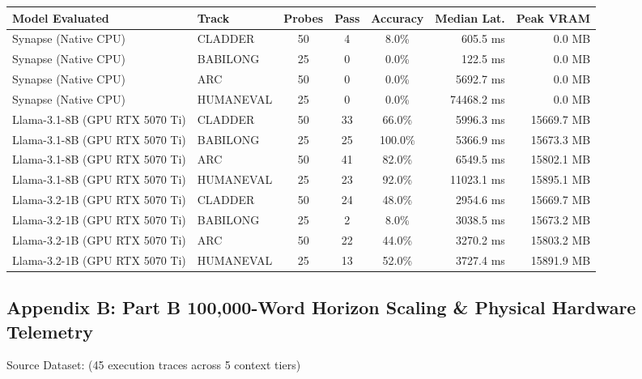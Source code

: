 {\footnotesize\sffamily
\setlength{\tabcolsep}{4pt}
\noindent\begin{tabularx}{\textwidth}{p{3.4cm} X c c c r r}
\toprule
\textbf{\color{brandnavy}Model Evaluated} & \textbf{\color{brandnavy}Track} & \textbf{\color{brandnavy}Probes} & \textbf{\color{brandnavy}Pass} & \textbf{\color{brandnavy}Accuracy} & \textbf{\color{brandnavy}Median Lat.} & \textbf{\color{brandnavy}Peak VRAM} \\
\midrule
Synapse (Native CPU) & CLADDER & 50 & 4 & 8.0\% & 605.5 ms & 0.0 MB \\
Synapse (Native CPU) & BABILONG & 25 & 0 & 0.0\% & 122.5 ms & 0.0 MB \\
Synapse (Native CPU) & ARC & 50 & 0 & 0.0\% & 5692.7 ms & 0.0 MB \\
Synapse (Native CPU) & HUMANEVAL & 25 & 0 & 0.0\% & 74468.2 ms & 0.0 MB \\
Llama-3.1-8B (GPU RTX 5070 Ti) & CLADDER & 50 & 33 & 66.0\% & 5996.3 ms & 15669.7 MB \\
Llama-3.1-8B (GPU RTX 5070 Ti) & BABILONG & 25 & 25 & 100.0\% & 5366.9 ms & 15673.3 MB \\
Llama-3.1-8B (GPU RTX 5070 Ti) & ARC & 50 & 41 & 82.0\% & 6549.5 ms & 15802.1 MB \\
Llama-3.1-8B (GPU RTX 5070 Ti) & HUMANEVAL & 25 & 23 & 92.0\% & 11023.1 ms & 15895.1 MB \\
Llama-3.2-1B (GPU RTX 5070 Ti) & CLADDER & 50 & 24 & 48.0\% & 2954.6 ms & 15669.7 MB \\
Llama-3.2-1B (GPU RTX 5070 Ti) & BABILONG & 25 & 2 & 8.0\% & 3038.5 ms & 15673.2 MB \\
Llama-3.2-1B (GPU RTX 5070 Ti) & ARC & 50 & 22 & 44.0\% & 3270.2 ms & 15803.2 MB \\
Llama-3.2-1B (GPU RTX 5070 Ti) & HUMANEVAL & 25 & 13 & 52.0\% & 3727.4 ms & 15891.9 MB \\
\bottomrule
\end{tabularx}
\vspace{0.2em}
}

\vspace{0.8em}
\subsection*{Appendix B: Part B 100,000-Word Horizon Scaling \& Physical Hardware Telemetry}
\noindent\textsf{\footnotesize Source Dataset:  (45 execution traces across 5 context tiers)}
\vspace{0.2em}

